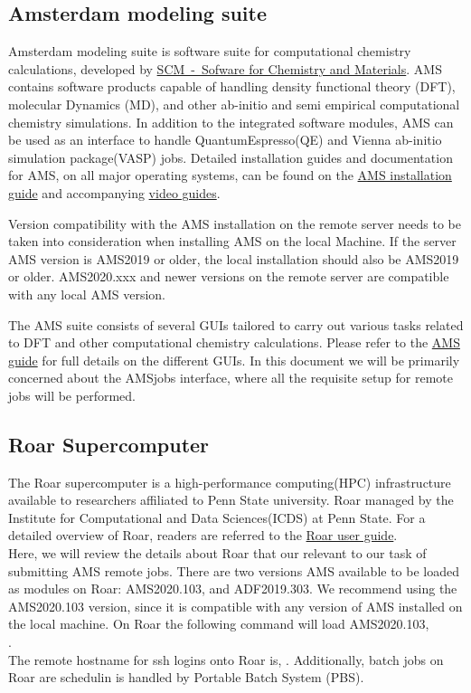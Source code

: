 \subsection*{Amsterdam modeling suite}
Amsterdam modeling suite is software suite for computational chemistry calculations, developed by \href{https://www.scm.com/}{SCM~-~Sofware for Chemistry and Materials}. 
AMS contains software products capable of handling density functional theory (DFT), molecular Dynamics (MD), and other ab-initio and semi empirical computational chemistry simulations. 
In addition to the integrated software modules, AMS can be used as an interface to handle QuantumEspresso(QE) and Vienna ab-initio simulation package(VASP) jobs. 
Detailed installation guides and documentation for AMS, on all major operating systems, can be found on the \href{https://www.scm.com/doc/Installation/index.html}{AMS installation guide} and accompanying \href{https://www.scm.com/support/ams-installation-videos/}{video guides}. 
\begin{tcolorbox}[colback=pantone!10!white,colframe=pantone,title=\textit{Note:}]
    Version compatibility with the AMS installation on the remote server needs to be taken into consideration when installing AMS on the local Machine. 
    If the server AMS version is AMS2019 or older, the local installation should also be AMS2019 or older. 
    AMS2020.xxx and newer versions on the remote server are compatible with any local AMS version.
\end{tcolorbox}
\noindent The AMS suite consists of several GUIs tailored to carry out various tasks related to DFT and other computational chemistry calculations. Please refer to the \href{https://www.scm.com/doc/Tutorials/GettingStarted/GUIModules.html#modules}{AMS guide} for full details on the different GUIs. In this document we will be primarily concerned about the AMSjobs interface, where all the requisite setup for remote jobs will be performed.
\subsection*{Roar Supercomputer}
The Roar supercomputer is a high-performance computing(HPC) infrastructure available to researchers affiliated to Penn State university. 
Roar managed by the Institute for Computational and Data Sciences(ICDS) at Penn State. 
For a detailed overview of Roar, readers are referred to the \href{https://www.icds.psu.edu/computing-services/roar-user-guide/}{Roar user guide}. \\

Here, we will review the details about Roar that our relevant to our task of submitting AMS remote jobs. 
There are two versions AMS available to be loaded as modules on Roar: AMS2020.103, and ADF2019.303. 
We recommend using the AMS2020.103 version, since it is compatible with any version of AMS installed on the local machine. 
On Roar the following command will load AMS2020.103, \\
.\\

The remote hostname for ssh logins onto Roar is, . Additionally, batch jobs on Roar are schedulin is handled by Portable Batch System (PBS).
\vspace{1em}